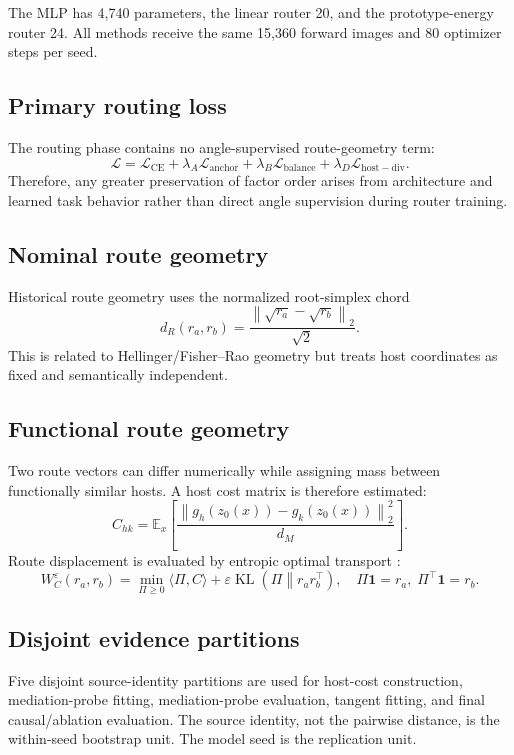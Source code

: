 \documentclass[11pt,a4paper]{article}
\newcommand{\E}{\mathbb{E}}
\newcommand{\loss}{\mathcal{L}}
\newcommand{\norm}[1]{\left\lVert #1 \right\rVert}
\newcommand{\KL}{\operatorname{KL}}
\begin{document}
The MLP has 4,740 parameters, the linear router 20, and the prototype-energy router 24. All methods receive the same 15,360 forward images and 80 optimizer steps per seed.

\subsection{Primary routing loss}
The routing phase contains no angle-supervised route-geometry term:
\begin{equation}
\loss=\loss_{\mathrm{CE}}+\lambda_A\loss_{\mathrm{anchor}}+\lambda_B\loss_{\mathrm{balance}}+\lambda_D\loss_{\mathrm{host-div}}.
\end{equation}
Therefore, any greater preservation of factor order arises from architecture and learned task behavior rather than direct angle supervision during router training.

\subsection{Nominal route geometry}
Historical route geometry uses the normalized root-simplex chord
\begin{equation}
d_R(r_a,r_b)=\frac{\norm{\sqrt{r_a}-\sqrt{r_b}}_2}{\sqrt2}.
\end{equation}
This is related to Hellinger/Fisher--Rao geometry but treats host coordinates as fixed and semantically independent.

\subsection{Functional route geometry}
Two route vectors can differ numerically while assigning mass between functionally similar hosts. A host cost matrix is therefore estimated:
\begin{equation}
C_{hk}=\E_x\left[\frac{\norm{g_h(z_0(x))-g_k(z_0(x))}_2^2}{d_M}\right].
\end{equation}
Route displacement is evaluated by entropic optimal transport \cite{peyre2019ot,cuturi2013sinkhorn}:
\begin{equation}
W_C^\varepsilon(r_a,r_b)=
\min_{\Pi\ge0}\langle\Pi,C\rangle+
\varepsilon\KL\!\left(\Pi\middle\|r_ar_b^\top\right),
\quad
\Pi\mathbf 1=r_a,\;\Pi^\top\mathbf 1=r_b.
\end{equation}

\subsection{Disjoint evidence partitions}
Five disjoint source-identity partitions are used for host-cost construction, mediation-probe fitting, mediation-probe evaluation, tangent fitting, and final causal/ablation evaluation. The source identity, not the pairwise distance, is the within-seed bootstrap unit. The model seed is the replication unit.
\end{document}
